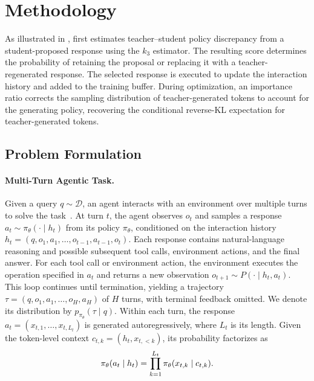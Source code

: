 \section{Methodology}
\label{sec:methodology}

\vspace{-0.5em}
As illustrated in , \name first estimates teacher--student policy discrepancy from a student-proposed response using the $k_3$ estimator.
The resulting score determines the probability of retaining the proposal or replacing it with a teacher-regenerated response.
The selected response is executed to update the interaction history and added to the training buffer.
During optimization, an importance ratio corrects the sampling distribution of teacher-generated tokens to account for the generating policy, recovering the conditional reverse-KL expectation for teacher-generated tokens.
\vspace{-0.5em}

\subsection{Problem Formulation}
\label{sec:problem_formulation} 

\vspace{-0.5em}
\paragraph{Multi-Turn Agentic Task.}
Given a query $q\sim\mathcal{D}$, an agent interacts with an environment over multiple turns to solve the task~\citep{YaoZYDSN023,ShridharYCBTH21,WangJCA22}.
At turn $t$, the agent observes $o_t$ and samples a response $a_t\sim\pi_\theta(\cdot\mid h_t)$ from its policy $\pi_\theta$, conditioned on the interaction history $h_t=(q,o_1,a_1,\ldots,o_{t-1},a_{t-1},o_t)$.
Each response contains natural-language reasoning and possible subsequent tool calls, environment actions, and the final answer.
For each tool call or environment action, the environment executes the operation specified in $a_t$ and returns a new observation $o_{t+1}\sim P(\cdot\mid h_t,a_t)$.
This loop continues until termination, yielding a trajectory $\tau=(q,o_1,a_1,\ldots,o_H,a_H)$ of $H$ turns, with terminal feedback omitted.
We denote its distribution by $p_{\pi_\theta}(\tau\mid q)$. 
Within each turn, the response $a_t=(x_{t,1},\ldots,x_{t,L_t})$ is generated autoregressively, where $L_t$ is its length.
Given the token-level context $c_{t,k}=(h_t,x_{t,<k})$, its probability factorizes as
\begin{equation}
    \setlength\abovedisplayskip{1pt}
    \setlength\belowdisplayskip{1pt}
    \pi_\theta(a_t\mid h_t)
    =\prod_{k=1}^{L_t}\pi_\theta(x_{t,k}\mid c_{t,k}).
    \label{eq:turn_policy_factorization}
\end{equation}

